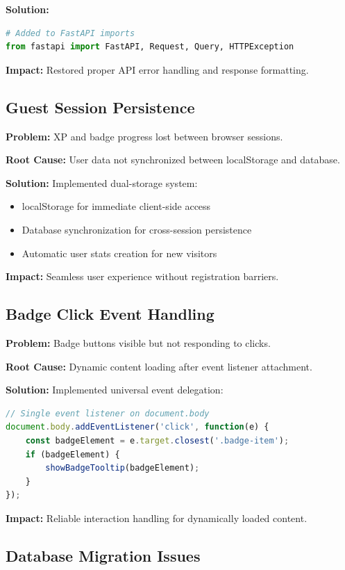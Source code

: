 \documentclass[11pt,a4paper]{article}
\begin{document}
\textbf{Solution:}
\begin{lstlisting}[language=Python]
# Added to FastAPI imports
from fastapi import FastAPI, Request, Query, HTTPException
\end{lstlisting}

\textbf{Impact:} Restored proper API error handling and response formatting.

\subsection{Guest Session Persistence}

\textbf{Problem:} XP and badge progress lost between browser sessions.

\textbf{Root Cause:} User data not synchronized between localStorage and database.

\textbf{Solution:} Implemented dual-storage system:
\begin{itemize}
    \item localStorage for immediate client-side access
    \item Database synchronization for cross-session persistence
    \item Automatic user stats creation for new visitors
\end{itemize}

\textbf{Impact:} Seamless user experience without registration barriers.

\subsection{Badge Click Event Handling}

\textbf{Problem:} Badge buttons visible but not responding to clicks.

\textbf{Root Cause:} Dynamic content loading after event listener attachment.

\textbf{Solution:} Implemented universal event delegation:
\begin{lstlisting}[language=JavaScript]
// Single event listener on document.body
document.body.addEventListener('click', function(e) {
    const badgeElement = e.target.closest('.badge-item');
    if (badgeElement) {
        showBadgeTooltip(badgeElement);
    }
});
\end{lstlisting}

\textbf{Impact:} Reliable interaction handling for dynamically loaded content.

\subsection{Database Migration Issues}
\end{document}
